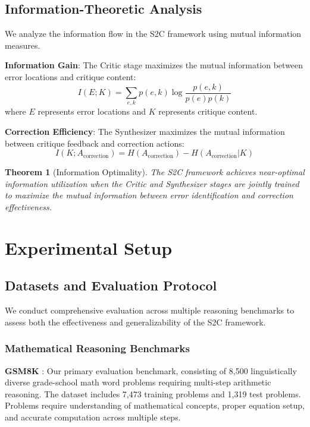 \documentclass[10pt,twocolumn]{article}
\newtheorem{theorem}{Theorem}
\newcommand{\ssc}{\textsc{S2C}}
\begin{document}
\subsection{Information-Theoretic Analysis}

We analyze the information flow in the \ssc{} framework using mutual information measures.

\textbf{Information Gain}: The Critic stage maximizes the mutual information between error locations and critique content:
\begin{equation}
I(E; K) = \sum_{e,k} p(e,k) \log \frac{p(e,k)}{p(e)p(k)}
\end{equation}
where $E$ represents error locations and $K$ represents critique content.

\textbf{Correction Efficiency}: The Synthesizer maximizes the mutual information between critique feedback and correction actions:
\begin{equation}
I(K; A_{\text{correction}}) = H(A_{\text{correction}}) - H(A_{\text{correction}} | K)
\end{equation}

\begin{theorem}[Information Optimality]
\label{thm:info_optimality}
The \ssc{} framework achieves near-optimal information utilization when the Critic and Synthesizer stages are jointly trained to maximize the mutual information between error identification and correction effectiveness.
\end{theorem}

\section{Experimental Setup} \label{sec:experiments}

\subsection{Datasets and Evaluation Protocol}

We conduct comprehensive evaluation across multiple reasoning benchmarks to assess both the effectiveness and generalizability of the \ssc{} framework.

\subsubsection{Mathematical Reasoning Benchmarks}

\textbf{GSM8K} \cite{cobbe2021training}: Our primary evaluation benchmark, consisting of 8,500 linguistically diverse grade-school math word problems requiring multi-step arithmetic reasoning. The dataset includes 7,473 training problems and 1,319 test problems. Problems require understanding of mathematical concepts, proper equation setup, and accurate computation across multiple steps.
\end{document}
